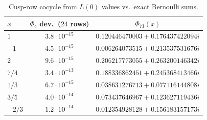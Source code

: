 \begin{table}[ht]\centering\small
\begin{tabular}{lcc}\toprule
$x$ & $\Phi_c$ dev.\ ($24$ rows) & $\Phi_{73}(x)$\\\midrule
$1$ & $3.8\cdot10^{-15}$ & $0.120446470003+0.176437422094i$\\
$-1$ & $4.5\cdot10^{-15}$ & $0.006264073515+0.213537531676i$\\
$2$ & $9.6\cdot10^{-15}$ & $0.206217773055+0.263200146342i$\\
$7/4$ & $3.4\cdot10^{-13}$ & $0.188336862451+0.245368413466i$\\
$1/3$ & $6.7\cdot10^{-15}$ & $0.038631276713+0.077116144808i$\\
$3/5$ & $4.0\cdot10^{-14}$ & $0.073437646967+0.123627119436i$\\
$-2/3$ & $1.2\cdot10^{-14}$ & $0.012354928128+0.156183157173i$\\\bottomrule
\end{tabular}
\caption{Cusp-row cocycle from $L(0)$ values vs.\ exact Bernoulli sums.}\label{tab:phi73}
\end{table}
